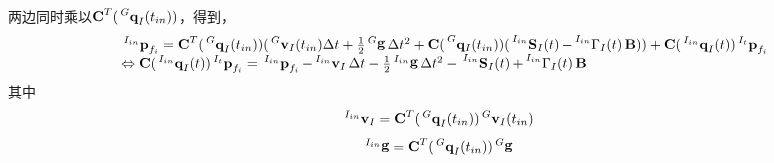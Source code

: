 \documentclass{article}
\begin{document}
两边同时乘以$\textbf{C}^T(\sideset{^G}{}{\mathop{\textbf{q}_{I}}}(t_{in}))$，得到，
\begin{equation}\label{eqs:geometryRelation1}
    \begin{array}{ll}
        &\sideset{^{I_{in}}}{}{\mathop{\textbf{p}_{f_i}}}
        =\textbf{C}^T(\sideset{^G}{}{\mathop{\textbf{q}_{I}}}(t_{in}))
        (\sideset{^G}{}{\mathop{\textbf{v}_{I}}}(t_{in})\Delta{t}
        +\frac{1}{2}\sideset{^G}{}{\mathop{\mathbf{g}}}\Delta{t}^{2}
        +\textbf{C}(\sideset{^G}{}{\mathop{\mathbf{q}_{I}(t_{in})}})
        (\sideset{^{I_{in}}}{}{\mathop{\textbf{S}_{I}(t)}}
        -\sideset{^{I_{in}}}{}{\mathop{{\Gamma}_{I}(t)}}\textbf{B}))
        +\textbf{C}(\sideset{^{I_{in}}}{}{\mathop{\textbf{q}_{I}}}(t))
        \sideset{^{I_t}}{}{\mathop{\textbf{p}_{f_i}}}\\
        &\Leftrightarrow
        \textbf{C}(\sideset{^{I_{in}}}{}{\mathop{\textbf{q}_{I}}}(t))
        \sideset{^{I_t}}{}{\mathop{\textbf{p}_{f_i}}}
        =\sideset{^{I_{in}}}{}{\mathop{\textbf{p}_{f_i}}}
        -\sideset{^{I_{in}}}{}{\mathop{\textbf{v}_I}}\Delta{t}
        -\frac{1}{2}\sideset{^{I_{in}}}{}{\mathop{\mathbf{g}}}\Delta{t}^{2}
        -\sideset{^{I_{in}}}{}{\mathop{\textbf{S}_{I}(t)}}
        +\sideset{^{I_{in}}}{}{\mathop{{\Gamma}_{I}(t)}}\textbf{B}
    \end{array}
\end{equation}
其中
\begin{equation}
    \sideset{^{I_{in}}}{}{\mathop{\textbf{v}_I}}
    =\textbf{C}^T(\sideset{^G}{}{\mathop{\textbf{q}_{I}}}(t_{in}))
    \sideset{^G}{}{\mathop{\textbf{v}_{I}}}(t_{in})
\end{equation}
\begin{equation}
    \sideset{^{I_{in}}}{}{\mathop{\mathbf{g}}}
    =\textbf{C}^T(\sideset{^G}{}{\mathop{\textbf{q}_{I}}}(t_{in}))
    \sideset{^G}{}{\mathop{\mathbf{g}}}
\end{equation}
\end{document}
